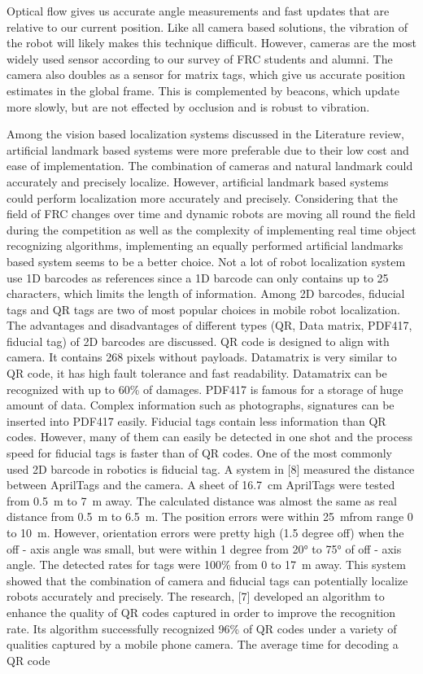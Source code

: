 \documentclass{article}
\begin{document}
  Optical flow gives us accurate angle measurements and fast updates that are relative to our current position. Like all camera based solutions, the vibration of the robot will likely makes this technique difficult. However, cameras are the most widely used sensor according to our survey of FRC students and alumni.
  The camera also doubles as a sensor for matrix tags, which give us accurate position estimates in the global frame. This is complemented by beacons, which update more slowly, but are not effected by occlusion and is robust to vibration.

  Among the vision based localization systems discussed in the Literature review, artificial landmark based systems were more preferable due to their low cost and ease of implementation. The combination of cameras and natural landmark could accurately and precisely localize. However, artificial landmark based systems could perform localization more accurately and precisely. Considering that the field of FRC changes over time and dynamic robots are moving all round the field during the competition as well as the complexity of implementing real time object recognizing algorithms, implementing an equally performed artificial landmarks based system seems to be a better choice. Not a lot of robot localization system use 1D barcodes as references since a 1D barcode can only contains up to 25 characters, which limits the length of information. Among 2D barcodes, fiducial tags and QR tags are two of most popular choices in mobile robot localization. The advantages and disadvantages of different types (QR, Data matrix, PDF417, fiducial tag) of 2D barcodes are discussed. QR code is designed to align with camera. It contains 268 pixels without payloads. Datamatrix is very similar to QR code, it has high fault tolerance and fast readability. Datamatrix can be recognized with up to 60\% of damages. PDF417 is famous for a storage of huge amount of data. Complex information such as photographs, signatures can be inserted into PDF417 easily. Fiducial tags contain less information than QR codes. However, many of them can easily be detected in one shot and the process speed for fiducial tags is faster than of QR codes. One of the most commonly used 2D barcode in robotics is fiducial tag. A system in [8] measured the distance between AprilTags and the camera. A sheet of \SI{16.7}{\centi\meter} AprilTags were tested from \SI {0.5}{\meter} to \SI{7}{\meter} away. The calculated distance was almost the same as real distance from \SI{0.5}{\meter} to \SI{6.5}{\meter}. The position errors were within \SI{25}{\meter}from range 0 to \SI{10}{\meter}. However, orientation errors were pretty high (1.5 degree off) when the off - axis angle was small, but were within 1 degree from \ang{20} to \ang{75} of off - axis angle. The detected rates for tags were 100\% from 0 to \SI{17}{\meter} away. This system showed that the combination of camera and fiducial tags can potentially localize robots accurately and precisely. The research, [7] developed an algorithm to enhance the quality of QR codes captured in order to improve the recognition rate. Its algorithm successfully recognized 96\% of QR codes under a variety of qualities captured by a mobile phone camera. The average time for decoding a QR code 
\end{document}
